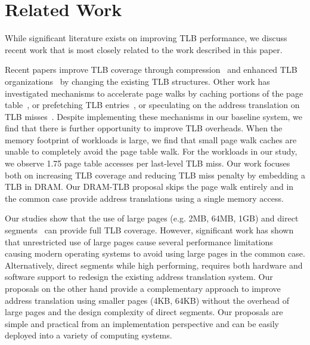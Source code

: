 \section{Related Work}

\noindent While significant literature exists on improving TLB
performance, we discuss recent work that is most closely related to
the work described in this paper.

 Recent papers improve TLB
coverage through compression~\cite{COLT, tlbreachclustering} and
enhanced TLB organizations~\cite{SharedLLT, simTLBperf} by changing
the existing TLB structures. Other work has investigated mechanisms to
accelerate page walks by caching portions of the page
table~\cite{SkipPT,MMUcaches}, or prefetching TLB entries~\cite{prefTLBintercore, prefTLBgokul, prefTLBrecency,
power2014supporting}, or speculating on the address translation on TLB
misses~\cite{spectlb}. Despite implementing these mechanisms
in our baseline system, we find that there is further opportunity to improve TLB overheads. When the memory footprint of workloads is large, we 
find
that small page walk caches are unable to completely avoid the page
table walk. For the workloads in our study, we observe 1.75 page table
accesses per last-level TLB miss. Our work focuses both on increasing
TLB coverage and reducing TLB miss penalty by embedding a TLB in DRAM.
Our DRAM-TLB proposal skips the page walk entirely and in the common
case provide address translations using a single memory access.

 Our studies show that
the use of large pages (e.g. 2MB, 64MB, 1GB) and direct
segments~\cite{Basu2013} can provide full TLB coverage. However,
significant work has shown that unrestricted use of large pages cause
several performance limitations
~\cite{SuperPageProblem,TwoPageSize,numa-harmful,cameo,largepagevm}
causing modern operating systems to avoid using large pages in the
common case. Alternatively, direct segments while high performing,
requires both hardware and software support to redesign the existing
address translation system. Our proposals on the other hand provide a
complementary approach to improve address translation using smaller
pages (4KB, 64KB) without the overhead of large pages and the design
complexity of direct segments. Our proposals are simple and practical
from an implementation perspective and can be easily deployed into a
variety of computing systems.

